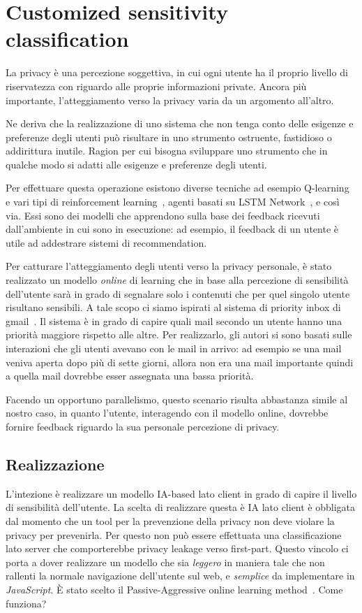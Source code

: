 \section{Customized sensitivity classification}
\label{sec:pres_sens_class}
La privacy è una percezione soggettiva, in cui ogni utente ha il proprio livello di riservatezza con riguardo alle proprie informazioni private. Ancora più importante, l'atteggiamento verso la privacy varia da un argomento all'altro. 

Ne deriva che la realizzazione di uno sistema che non tenga conto delle esigenze e preferenze degli utenti può risultare in uno strumento ostruente, fastidioso o addirittura inutile. Ragion per cui bisogna sviluppare uno strumento che in qualche modo si adatti alle esigenze e preferenze degli utenti. 

Per effettuare questa operazione esistono diverse tecniche ad esempio Q-learning~\cite{q-learning} e vari tipi di reinforcement learning~\cite{reinforce-learn}, agenti basati su LSTM Network~\cite{lstm}, e così via. Essi sono dei modelli che apprendono sulla base dei feedback ricevuti dall'ambiente in cui sono in esecuzione: ad esempio, il feedback di un utente è utile ad addestrare sistemi di recommendation.

Per catturare l'atteggiamento degli utenti verso la privacy personale, è stato realizzato un modello \textit{online} di learning che in base alla percezione di sensibilità dell'utente sarà in grado di segnalare solo i contenuti che per quel singolo utente risultano sensibili.
A tale scopo ci siamo ispirati al sistema di priority inbox di gmail~\cite{inbox}.
Il sistema è in grado di capire quali mail secondo un utente hanno una priorità maggiore rispetto alle altre. Per realizzarlo, gli autori si sono basati sulle interazioni che gli utenti avevano con le mail in arrivo: ad esempio se una mail veniva aperta dopo più di sette giorni, allora non era una mail importante quindi a quella mail dovrebbe esser assegnata una bassa priorità.

Facendo un opportuno parallelismo, questo scenario risulta abbastanza simile al nostro caso, in quanto l'utente, interagendo con il modello online, dovrebbe fornire feedback riguardo la sua personale percezione di privacy.

\subsection{Realizzazione}
L'intezione è realizzare un modello IA-based lato client in grado di capire il livello di sensibilità dell'utente. La scelta di realizzare questa è IA lato client è obbligata dal momento che un tool per la prevenzione della privacy non deve violare la privacy per prevenirla. Per questo non può essere effettuata una classificazione lato server che comporterebbe privacy leakage verso first-part. Questo vincolo ci porta a dover realizzare un modello che sia \textit{leggero} in maniera tale che non rallenti la normale navigazione dell'utente sul web, e \textit{semplice} da implementare in \textit{JavaScript}. È stato scelto il Passive-Aggressive online learning method~\cite{PAalgo}. Come funziona?

